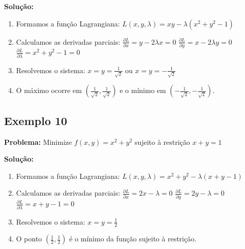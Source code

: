 \textbf{Solução:}
\begin{enumerate}
\item Formamos a função Lagrangiana:
$L(x,y,\lambda) = xy - \lambda(x^2 + y^2 - 1)$
\item Calculamos as derivadas parciais:
$\frac{\partial L}{\partial x} = y - 2\lambda x = 0$
$\frac{\partial L}{\partial y} = x - 2\lambda y = 0$
$\frac{\partial L}{\partial \lambda} = x^2 + y^2 - 1 = 0$
\item Resolvemos o sistema:
$x = y = \frac{1}{\sqrt{2}}$ ou $x = y = -\frac{1}{\sqrt{2}}$
\item O máximo ocorre em $(\frac{1}{\sqrt{2}}, \frac{1}{\sqrt{2}})$ e o mínimo em $(-\frac{1}{\sqrt{2}}, -\frac{1}{\sqrt{2}})$.
\end{enumerate}

\subsection{Exemplo 10}
\textbf{Problema:} Minimize $f(x,y) = x^2 + y^2$ sujeito à restrição $x + y = 1$

\textbf{Solução:}
\begin{enumerate}
\item Formamos a função Lagrangiana:
$L(x,y,\lambda) = x^2 + y^2 - \lambda(x + y - 1)$
\item Calculamos as derivadas parciais:
$\frac{\partial L}{\partial x} = 2x - \lambda = 0$
$\frac{\partial L}{\partial y} = 2y - \lambda = 0$
$\frac{\partial L}{\partial \lambda} = x + y - 1 = 0$
\item Resolvemos o sistema:
$x = y = \frac{1}{2}$
\item O ponto $(\frac{1}{2}, \frac{1}{2})$ é o mínimo da função sujeito à restrição.
\end{enumerate}